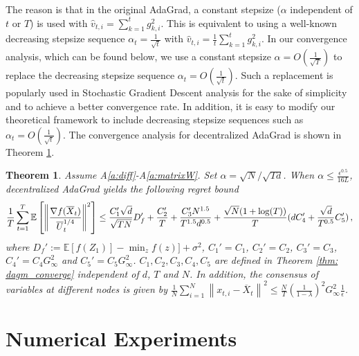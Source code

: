 \documentclass[11pt]{article}
\newtheorem{theorem}{Theorem}
\begin{document}
The reason is that in the original AdaGrad, a constant stepsize ($\alpha$ independent of $t$ or $T$) is used with  $\hat v_{t,i} = {\sum_{k=1}^t g_{k,i}^2}$. 
This is equivalent to using a well-known decreasing stepsize sequence $\alpha_t = \frac{1}{\sqrt{t}}$ with  $\hat v_{t,i} = {\frac{1}{t}\sum_{k=1}^t g_{k,i}^2}$. 
In our convergence analysis, which can be found below, we use a constant stepsize $\alpha = O(\frac{1}{\sqrt{T}})$ to replace the decreasing stepsize sequence $\alpha_t =  O(\frac{1}{\sqrt{t}})$. 
Such a replacement is popularly used in Stochastic Gradient Descent analysis for the sake of simplicity and to achieve a better convergence rate. 
In addition, it is easy to modify our theoretical framework to include decreasing stepsize sequences such as $\alpha_t =  O(\frac{1}{\sqrt{
t}})$.
The convergence analysis for decentralized AdaGrad is shown in Theorem \ref{thm: dadagrad_converge}.
\begin{theorem}\label{thm: dadagrad_converge}
Assume A\ref{a:diff}-A\ref{a:matrixW}.
Set $\alpha = \sqrt{N}/\sqrt{Td}$. When $\alpha  \leq \frac{\epsilon^{0.5}}{16L} $, decentralized AdaGrad yields the following regret bound
	  \begin{align}\notag
 \frac{1}{T}\sum_{t=1}^T  \mathbb E \left [\left\|\frac{\nabla f( \overline X_{t})}{\overline U_{t}^{1/4}}\right\|^2  \right]
	  \leq     \frac{C_1' \sqrt{d}}{\sqrt{TN}} D_f'    +  \frac{ C_2'}{T} +  \frac{C_3' N^{1.5}}{T^{1.5}d^{0.5}}   + \frac{\sqrt{N}(1+\log (T))}{T} ( d C_4' + \frac{\sqrt{d} }{T^{0.5} }  C_5')\, ,
	  \end{align}
	where $D_f' := \mathbb E  [f( Z_{1})]  - \min_{z} f(z)]  + \sigma^2$, $C_1' = C_1$, $C_2' = C_2$, $C_3' = C_3$, $C_4' = C_4G_{\infty}^2$ and $C_5' = C_5 G_{\infty}^2 $. $C_1,C_2, C_3, C_4, C_5$ are  defined in Theorem \ref{thm: dagm_converge} independent of $d$, $T$ and $N$. In addition, the consensus of variables at different nodes is given by $\frac{1}{N}\sum_{i=1}^N\left\| {  x_{t,i} -   \overline X_{t}}  \right\|^2   \leq \frac{N}{T} \left (\frac{1}{1-\lambda} \right)^2  G_{\infty}^2 \frac{1}{\epsilon}$. 
\end{theorem}





\section{Numerical Experiments} \label{sec:numerical}
\end{document}
